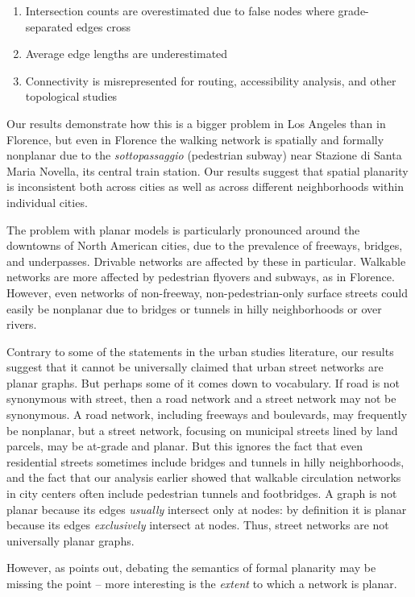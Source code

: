 \documentclass[Afour,sageh,times]{sagej}
\begin{document}
\begin{enumerate}
	\item{Intersection counts are overestimated due to false nodes where grade-separated edges cross}
	\item{Average edge lengths are underestimated}
	\item{Connectivity is misrepresented for routing, accessibility analysis, and other topological studies}
\end{enumerate}

Our results demonstrate how this is a bigger problem in Los Angeles than in Florence, but even in Florence the walking network is spatially and formally nonplanar due to the \textit{sottopassaggio} (pedestrian subway) near Stazione di Santa Maria Novella, its central train station. Our results suggest that spatial planarity is inconsistent both across cities as well as across different neighborhoods within individual cities.

The problem with planar models is particularly pronounced around the downtowns of North American cities, due to the prevalence of freeways, bridges, and underpasses. Drivable networks are affected by these in particular. Walkable networks are more affected by pedestrian flyovers and subways, as in Florence. However, even networks of non-freeway, non-pedestrian-only surface streets could easily be nonplanar due to bridges or tunnels in hilly neighborhoods or over rivers.

Contrary to some of the statements in the urban studies literature, our results suggest that it cannot be universally claimed that urban street networks are planar graphs. But perhaps some of it comes down to vocabulary. If road is not synonymous with street, then a road network and a street network may not be synonymous. A road network, including freeways and boulevards, may frequently be nonplanar, but a street network, focusing on municipal streets lined by land parcels, may be at-grade and planar. But this ignores the fact that even residential streets sometimes include bridges and tunnels in hilly neighborhoods, and the fact that our analysis earlier showed that walkable circulation networks in city centers often include pedestrian tunnels and footbridges. A graph is not planar because its edges \emph{usually} intersect only at nodes: by definition it is planar because its edges \emph{exclusively} intersect at nodes. Thus, street networks are not universally planar graphs. 

However, as \citet{newman_networks:_2010} points out, debating the semantics of formal planarity may be missing the point -- more interesting is the \emph{extent} to which a network is planar.
\end{document}
